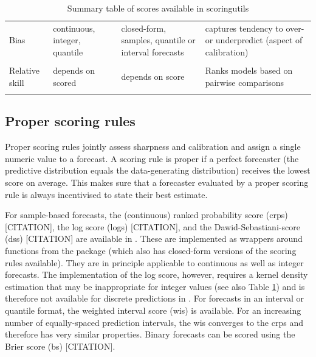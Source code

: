 \documentclass[article,shortnames]{jss}
\begin{document}
\begin{table}[h!]
\begin{longtable}[t]{>{\raggedright\arraybackslash}p{2.5cm}>{\raggedright\arraybackslash}p{2cm}>{\raggedright\arraybackslash}p{4.5cm}>{\raggedright\arraybackslash}p{4cm}}
\addlinespace
Bias & continuous, integer, quantile & closed-form, samples, quantile or interval forecasts & captures tendency to over-or underpredict (aspect of calibration)\\
\addlinespace
\cellcolor{gray!6}{Mean score ratio} & \cellcolor{gray!6}{depends on score} & \cellcolor{gray!6}{depends on score} & \cellcolor{gray!6}{compares performance of two models}\\
\addlinespace
Relative skill & depends on scored & depends on score & Ranks models based on pairwise comparisons\\*
\end{longtable}\caption{\label{tab:table-summary-scores} Summary table of scores available in scoringutils}
\end{table}


\subsection{Proper scoring rules}

Proper scoring rules \citep{gneitingStrictlyProperScoring2007} jointly assess sharpness and calibration and assign a single numeric value to a forecast. A scoring rule is proper if a perfect forecaster (the predictive distribution equals the data-generating distribution) receives the lowest score on average. This makes sure that a forecaster evaluated by a proper scoring rule is always incentivised to state their best estimate. 

For sample-based forecasts, the (continuous) ranked probability score (crps) [CITATION], the log score (logs) [CITATION], and the Dawid-Sebastiani-score (dss) [CITATION] are available in . These are implemented as wrappers around functions from the  package (which also has closed-form versions of the scoring rules available). They are in principle applicable to continuous as well as integer forecasts. The  implementation of the log score, however, requires a kernel density estimation that may be inappropriate for integer values (see also Table \ref{tab:table-summary-scores}) and is therefore not available for discrete predictions in . 
For forecasts in an interval or quantile format, the weighted interval score (wis) \citep{bracherEvaluatingEpidemicForecasts2020a} is available. For an increasing number of equally-spaced prediction intervals, the wis converges to the crps and therefore has very similar properties. Binary forecasts can be scored using the Brier score (bs) [CITATION]. 
\end{document}
